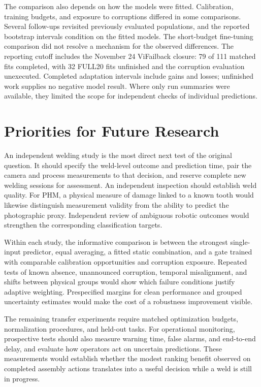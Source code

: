 The comparison also depends on how the models were fitted. Calibration, training budgets, and exposure to corruptions differed in some comparisons. Several follow-ups revisited previously evaluated populations, and the reported bootstrap intervals condition on the fitted models. The short-budget fine-tuning comparison did not resolve a mechanism for the observed differences. The reporting cutoff includes the November 24 ViFailback closure: 79 of 111 matched fits completed, with 32 FULL20 fits unfinished and the corruption evaluation unexecuted. Completed adaptation intervals include gains and losses; unfinished work supplies no negative model result. Where only run summaries were available, they limited the scope for independent checks of individual predictions.

\section{Priorities for Future Research}
An independent welding study is the most direct next test of the original question. It should specify the weld-level outcome and prediction time, pair the camera and process measurements to that decision, and reserve complete new welding sessions for assessment. An independent inspection should establish weld quality. For PHM, a physical measure of damage linked to a known tooth would likewise distinguish measurement validity from the ability to predict the photographic proxy. Independent review of ambiguous robotic outcomes would strengthen the corresponding classification targets.

Within each study, the informative comparison is between the strongest single-input predictor, equal averaging, a fitted static combination, and a gate trained with comparable calibration opportunities and corruption exposure. Repeated tests of known absence, unannounced corruption, temporal misalignment, and shifts between physical groups would show which failure conditions justify adaptive weighting. Prespecified margins for clean performance and grouped uncertainty estimates would make the cost of a robustness improvement visible.

The remaining transfer experiments require matched optimization budgets, normalization procedures, and held-out tasks. For operational monitoring, prospective tests should also measure warning time, false alarms, and end-to-end delay, and evaluate how operators act on uncertain predictions. These measurements would establish whether the modest ranking benefit observed on completed assembly actions translates into a useful decision while a weld is still in progress.
